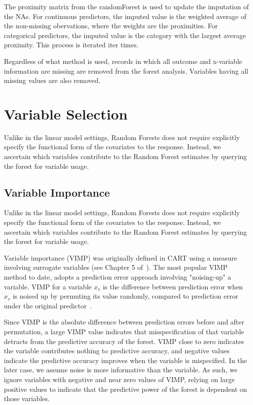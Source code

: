 \documentclass[nojss]{jss}\usepackage[]{graphicx}\usepackage[]{color}
\begin{document}
The proximity matrix from the randomForest is used to update the imputation of the NAs. For continuous predictors, the imputed value is the weighted average of the non-missing obervations, where the weights are the proximities. For categorical predictors, the imputed value is the category with the largest average proximity. This process is iterated iter times.

Regardless of what method is used, records in which all outcome and x-variable information are missing are removed from the forest analysis. Variables having all missing values are also removed.


\section{Variable Selection}
Unlike in the linear model settings, Random Forests does not require explicitly specify the functional form of the covariates to the response. Instead, we ascertain which variables contribute to the Random Forest estimates by querying the forest for variable usage. 

\subsection{Variable Importance}\label{S:vimp}
Unlike in the linear model settings, Random Forests does not require explicitly specify the functional form of the covariates to the response. Instead, we ascertain which variables contribute to the Random Forest estimates by querying the forest for variable usage. 

Variable importance (VIMP) was originally defined in CART using a measure involving surrogate variables (see Chapter 5 of~\cite{cart:1984}). The most popular VIMP method to date, adopts a prediction error approach involving "noising-up" a variable. VIMP for a variable $x_v$ is the difference between prediction error when $x_v$ is noised up by permuting its value randomly, compared to prediction error under the original predictor~\citep{Breiman:2001, liaw:2002, Ishwaran:2007, Ishwaran:2008}.

Since VIMP is the absolute difference between prediction errors before and after permutation, a large VIMP value indicates that misspecification of that variable detracts from the predictive accuracy of the forest. VIMP close to zero indicates the variable contributes nothing to predictive accuracy, and negative values indicate the predictive accuracy improves when the variable is mispecified. In the later case, we assume noise is more informative than the variable. As such, we ignore variables with negative and near zero values of VIMP, relying on large positive values to indicate that the predictive power of the forest is dependent on those variables. 
\end{document}

